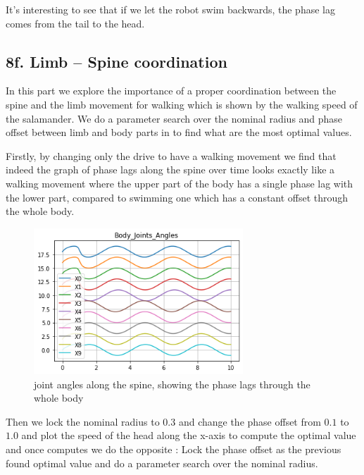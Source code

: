 \documentclass{cmc}
\begin{document}
It's interesting to see that if we let the robot swim backwards, the phase lag comes from the tail to the head.

\subsection*{8f. Limb – Spine coordination}
\label{sec:limb-spine-coordination}

In this part we explore the importance of a proper coordination between the spine and the limb movement for walking which is shown by the walking speed of the salamander. We do a parameter search over the nominal radius and phase offset between limb and body parts in  to find what are the most optimal values.

Firstly, by changing only the drive to have a walking movement we find that indeed the graph of phase lags along the spine over time looks exactly like a walking movement where the upper part of the body has a single phase lag with the lower part, compared to swimming one which has a constant offset through the whole body.

\begin{figure}[H]
  \centering
  \includegraphics[width=0.7\textwidth]{figures/8f_phaseLagsBody.png}
  \caption{joint angles along the spine, showing the phase lags through the whole body}
  \label{fig:8f_phaseLagsBody}
\end{figure}

Then we lock the nominal radius to $0.3$ and change the phase offset from $0.1$ to $1.0$ and plot the speed of the head along the x-axis to compute the optimal value and once computes we do the opposite : Lock the phase offset as the previous found optimal value and do a parameter search over the nominal radius.
\end{document}
